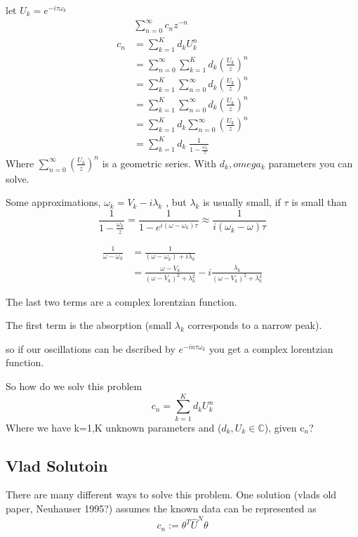 \documentclass{article}
\newcommand{\be}{\begin{equation}}
\newcommand{\ee}{\end{equation}}
\begin{document}
let $U_k = e^{-i\tau\omega_k}$
\be
\begin{split}
    &\sum_{n=0}^\infty c_nz^{-n}\\
    c_n &= \sum_{k=1}^K d_k U_k^n\\
    &= \sum_{n=0}^\infty \sum_{k=1}^K d_k\left(\frac{U_k}{z}\right)^n\\
    &= \sum_{k=1}^K \sum_{n=0}^\infty d_k\left(\frac{U_k}{z}\right)^n\\
    &= \sum_{k=1}^K \sum_{n=0}^\infty d_k\left(\frac{U_k}{z}\right)^n\\
    &= \sum_{k=1}^K d_k \sum_{n=0}^\infty \left(\frac{U_k}{z}\right)^n\\
    &= \sum_{k=1}^K d_k \; \frac{1}{1 - \frac{\omega_k}{z}}
\end{split}
\ee
Where $\sum_{n=0}^\infty \left(\frac{U_k}{z}\right)^n$ is a geometric series.
With $d_k,omega_k$ parameters you can solve.

Some approximations, $\omega_k = V_k - i\lambda_k$ , but $\lambda_k$ is usually small, if $\tau$ is small than
\be
\frac{1}{1-\frac{\omega_k}{z}} = \frac{1}{1-e^{i(\omega-\omega_k)\tau}} \approx \frac{1}{i(\omega_k-\omega)\tau}
\ee

\be
\begin{split}
    \frac{1}{\omega-\omega_k} &= \frac{1}{(\omega-\omega_k)+i\lambda_k} \\
    &= \frac{\omega-V_k}{(\omega-V_k)^2 + \lambda_k^2} - i \frac{\lambda_k}{(\omega-V_k)^2+\lambda_k^2}
\end{split}
\ee

The last two terms are a complex lorentzian function.

The first term is the absorption (small $\lambda_k$ corresponds to a narrow peak).

so if our oscillations can be dscribed by $e^{-in\tau\omega_k}$ you get a complex lorentzian function.

So how do we solv this problem
\be
c_n = \sum_{k=1}^K d_kU_k^n
\ee
Where we have k=1,K unknown parameters and ($d_k,U_k \in \mathbb{C}$), given c$_n$?

\subsection{Vlad Solutoin}
There are many different ways to solve this problem.
One solution (vlads old paper, Neuhauser 1995?) assumes the known data can be represented as
\be
c_n := \theta^T\widehat{U}^N\theta
\ee
\end{document}
